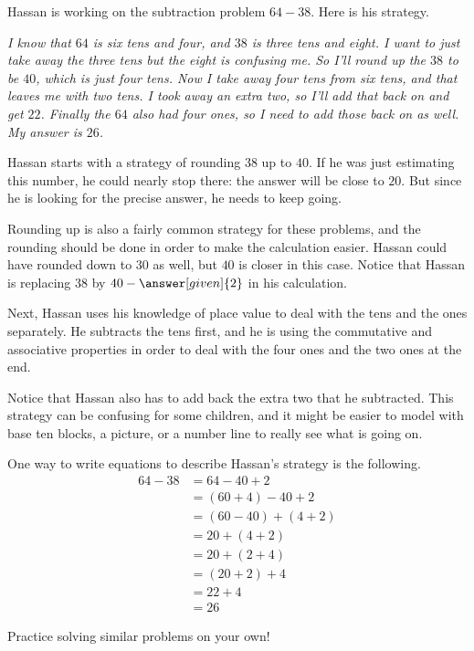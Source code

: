 \documentclass{ximera}
\begin{document}
\begin{example}
Hassan is working on the subtraction problem $64 - 38$. Here is his strategy.

\emph{ I know that $64$ is six tens and four, and $38$ is three tens and eight. I want to just take away the three tens but the eight is confusing me. So I'll round up the $38$ to be $40$, which is just four tens. Now I take away four tens from six tens, and that leaves me with two tens. I took away an extra two, so I'll add that back on and get $22$. Finally the $64$ also had four ones, so I need to add those back on as well. My answer is $26$.}

Hassan starts with a strategy of rounding $38$ up to $40$. If he was just estimating this number, he could nearly stop there: the answer will be close to $20$. But since he is looking for the precise answer, he needs to keep going.

Rounding up is also a fairly common strategy for these problems, and the rounding should be done in order to make the calculation easier. Hassan could have rounded down to $30$ as well, but $40$ is closer in this case. Notice that Hassan is replacing $38$ by $40 - \answer[given]{2}$ in his calculation. 

Next, Hassan uses his knowledge of place value to deal with the tens and the ones separately. He subtracts the tens first, and he is using the commutative and associative properties in order to deal with the four ones and the two ones at the end.

Notice that Hassan also has to add back the extra two that he subtracted. This strategy can be confusing for some children, and it might be easier to model with base ten blocks, a picture, or a number line to really see what is going on. 

One way to write equations to describe Hassan's strategy is the following.
\begin{align*}
64 - 38 &= 64 - 40 + 2 \\
&= (60 + 4) - 40 + 2 \\
&= (60 - 40) + (4 + 2) \\
&= 20 + (4 + 2) \\
&= 20 + (2 + 4) \\
& = (20 + 2) + 4 \\
& = 22 + 4 \\
&= 26
\end{align*}
\end{example}

Practice solving similar problems on your own!
\end{document}
